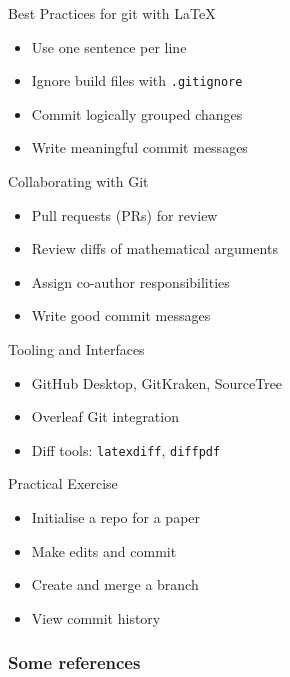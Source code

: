 \documentclass[12pt,t]{beamer}
\begin{document}
\begin{frame}{Best Practices for git with \LaTeX}
\begin{itemize}
    \item Use one sentence per line
		\pause
		\vspace{1em}
    \item Ignore build files with \texttt{.gitignore}
		\pause
		\vspace{1em}
    \item Commit logically grouped changes
		\pause
		\vspace{1em}
    \item Write meaningful commit messages
\end{itemize}
\end{frame}

\begin{frame}{Collaborating with Git}
\begin{itemize}
    \item Pull requests (PRs) for review
		\vspace{1em}
		\pause
    \item Review diffs of mathematical arguments
		\vspace{1em}
		\pause
    \item Assign co-author responsibilities
		\vspace{1em}
		\pause
    \item Write good commit messages
\end{itemize}
\end{frame}

\begin{frame}{Tooling and Interfaces}
\begin{itemize}
    \item GitHub Desktop, GitKraken, SourceTree
		\vspace{1em}
		\pause
    \item Overleaf Git integration
		\vspace{1em}
		\pause
    \item Diff tools: \texttt{latexdiff}, \texttt{diffpdf}
\end{itemize}
\end{frame}

\begin{frame}{Practical Exercise}
\begin{itemize}
    \item Initialise a repo for a paper
		\vspace{1em}
		\pause
    \item Make edits and commit
		\vspace{1em}
		\pause
    \item Create and merge a branch
		\vspace{1em}
		\pause
    \item View commit history
\end{itemize}
\end{frame}

\begin{frame}[allowframebreaks]\frametitle{Some references}
\nocite{*}


\end{frame}

		
\end{document}
